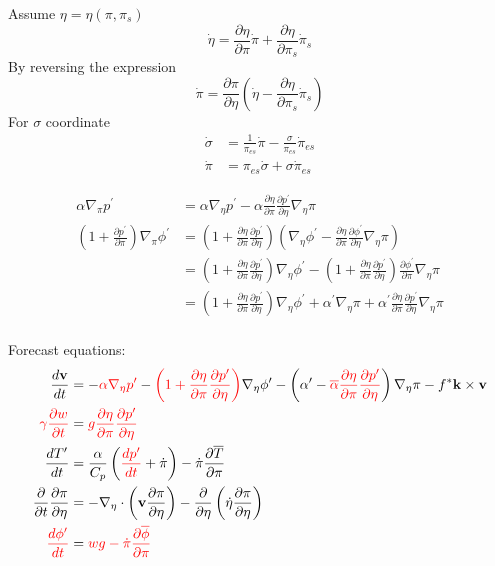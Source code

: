 \documentclass[12pt]{article}
\renewcommand{\d}[2]{\frac{d #1}{d #2}}
\newcommand{\dt}[1]{\d{#1}{t}}
\newcommand{\pd}[2]{\frac{\partial #1}{\partial #2}}
\newcommand{\pdt}[1]{\pd{#1}{t}}
\renewcommand{\vec}[1]{\mathbf{#1}}
\newcommand{\grad}[2][\pi]{\nabla_{#1} #2}
\renewcommand{\div}[2][\pi]{\nabla_{#1} \cdot #2}
\begin{document}
\pagebreak
Assume $\eta = \eta\left(\pi, \pi_{s}\right)$
\begin{equation*}
  \dot{\eta} = \pd{\eta}{\pi} \dot{\pi} + \pd{\eta}{\pi_s} \dot{\pi}_s
\end{equation*}
By reversing the expression
\begin{equation*}
  \dot{\pi} = \pd{\pi}{\eta} \left(\dot{\eta} - \pd{\eta}{\pi_s} \dot{\pi}_s\right)
\end{equation*}
For $\sigma$ coordinate
\begin{align*}
  \dot{\sigma} & = \frac{1}{\pi_{es}} \dot{\pi} - \frac{\sigma}{\pi_{es}} \dot{\pi}_{es} \\
  \dot{\pi} & = \pi_{es} \dot{\sigma} + \sigma \dot{\pi}_{es}
\end{align*}

\begin{align*}
  \alpha \grad[\pi]{p^\prime} & = \alpha \grad[\eta]{p^\prime} - \alpha \pd{\eta}{\pi} \pd{p^\prime}{\eta} \grad[\eta]{\pi} \\
  \left(1 + \pd{p^\prime}{\pi}\right) \grad[\pi]{\phi^\prime} & = \left(1 + \pd{\eta}{\pi} \pd{p^\prime}{\eta}\right) \left(\grad[\eta]{\phi^\prime} - \pd{\eta}{\pi} \pd{\phi^\prime}{\eta} \grad[\eta]{\pi}\right) \\
  & = \left(1 + \pd{\eta}{\pi} \pd{p^\prime}{\eta}\right) \grad[\eta]{\phi^\prime} - \left(1 + \pd{\eta}{\pi} \pd{p^\prime}{\eta}\right) \pd{\phi^\prime}{\pi} \grad[\eta]{\pi} \\
  & = \left(1 + \pd{\eta}{\pi} \pd{p^\prime}{\eta}\right) \grad[\eta]{\phi^\prime} + \alpha^\prime \grad[\eta]{\pi} + \alpha^\prime \pd{\eta}{\pi} \pd{p^\prime}{\eta} \grad[\eta]{\pi} \\
\end{align*}

Forecast equations:
\begin{align*}
  \dt{\vec{v}} & = - {\color{red}\alpha \grad[\eta]{p^\prime}} - {\color{red}\left(1 + \pd{\eta}{\pi} \pd{p^\prime}{\eta}\right)} \grad[\eta]{\phi^\prime} - \left(\alpha^\prime - {\color{red}\overline{\alpha} \pd{\eta}{\pi} \pd{p^\prime}{\eta}}\right) \grad[\eta]{\pi} - f^* \vec{k} \times \vec{v} \\
  {\color{red}\gamma \pdt{w}} & = {\color{red}g \pd{\eta}{\pi} \pd{p^\prime}{\eta}} \\
  \dt{T^\prime} & = \frac{\alpha}{C_p} \left({\color{red}\dt{p^\prime}} + \dot{\pi}\right) - \dot{\pi} \pd{\overline{T}}{\pi} \\
  \pdt{} \pd{\pi}{\eta} & = - \div[\eta]{\left(\vec{v} \pd{\pi}{\eta}\right)} - \pd{}{\eta} \left(\dot{\eta} \pd{\pi}{\eta}\right) \\
  {\color{red}\dt{\phi^\prime}} & = {\color{red}w g - \dot{\pi} \pd{\overline{\phi}}{\pi}}
\end{align*}
\end{document}

